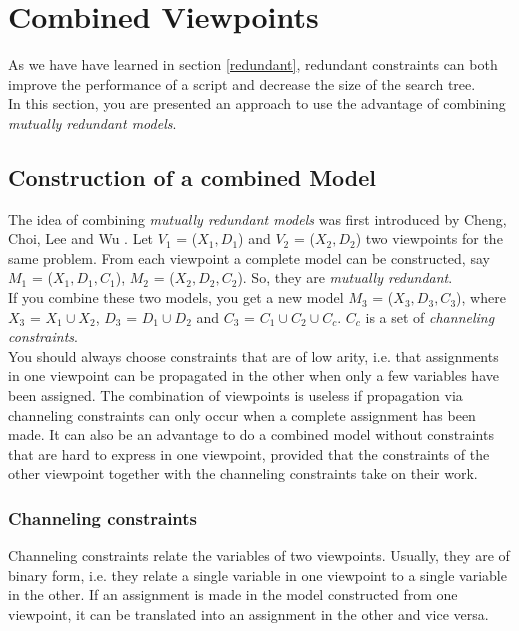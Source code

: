 \documentclass[a4paper]{scrartcl}
\begin{document}
\newpage
\section{Combined Viewpoints}
As we have have learned in section \ref{redundant}, redundant
constraints can both improve the performance of a script and
decrease the size of the search tree.\\

In this section, you are presented an approach to use the
advantage of combining {\it mutually redundant models}.


\subsection{Construction of a combined Model}
The idea of combining {\it mutually redundant models} was
first introduced by  Cheng, Choi, Lee and Wu \cite{9}.
Let $V_1$ = ($X_1, D_1$) and $V_2$ = ($X_2, D_2$) two viewpoints
for the same problem. From each viewpoint a complete
model can be constructed, say $M_1$ = ($X_1, D_1, C_1$), 
$M_2$ = ($X_2, D_2, C_2$). So, they are {\it mutually redundant}.\\

If you combine these two models, you get a new model 
$M_3$ = ($X_3, D_3, C_3$), where $X_3$ = $X_1 \cup X_2$, 
$D_3$ = $D_1 \cup D_2$
and $C_3$ =  $C_1 \cup C_2 \cup C_c$. $C_c$ is a set of
{\it channeling constraints}.\\

You should always choose constraints that are of low arity, i.e.
that assignments in one viewpoint can be propagated in the other when
only a few variables have been assigned. 
The combination of viewpoints is useless if propagation
via channeling constraints can only occur when a complete assignment
has been made. It can also be an advantage to do a combined model
without constraints that are hard to express in one viewpoint,
provided that the constraints of the other viewpoint together
with the channeling constraints take on their work.


\subsubsection{Channeling constraints}
Channeling constraints relate the variables of two
viewpoints. Usually, they are of binary form, i.e.
they relate a single variable in one viewpoint to
a single variable in the other. If an assignment 
is made in the model constructed
from one viewpoint, it can be translated into an 
assignment in the other and vice versa.\\
\end{document}
